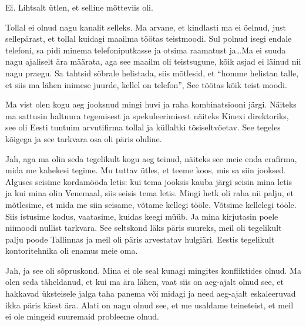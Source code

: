 
Ei. Lihtsalt ütlen, et selline mõtteviis oli. 


Tollal ei olnud nagu kanalit selleks. Ma arvane, et  kindlasti ma ei öelnud, just sellepärast, et tollal kuidagi maailma töötas teistmoodi. Sul polnud isegi endale telefoni, sa pidi minema telefoniputkasse ja otsima raamatust ja\ldots  Ma ei suuda nagu ajaliselt ära määrata, aga see maailm oli teistsugune, kõik asjad ei läinud nii nagu praegu. Sa tahtsid sõbrale helistada, siis mõtlesid, et \enquote{homme helistan talle, et siis ma lähen inimese juurde, kellel on telefon}, See töötas kõik teist moodi. 


Ma vist olen kogu aeg jooksnud mingi huvi ja raha kombinatsiooni järgi. Näiteks ma sattusin haltuura tegemisest ja spekuleerimisest näiteks Kinexi direktoriks, see oli Eesti tuntuim arvutifirma tollal ja küllaltki tõsiseltvõetav. See tegeles kõigega ja see tarkvara osa oli päris oluline. 


Jah, aga ma olin seda  tegelikult kogu aeg teinud, näiteks see meie enda erafirma, mida me kahekesi tegime. Mu tuttav ütles, et teeme koos, mis sa siin jooksed. Alguses seisime kordamööda letis: kui tema jooksis kauba järgi seisin mina letis  ja kui mina olin Venemaal, siis seisis tema letis. Mingi hetk oli raha nii palju, et mõtlesime, et mida me siin seisame, võtame kellegi tööle. Võtsime kellelegi tööle. Siis istusime kodus, vaatasime, kuidas keegi müüb. Ja mina kirjutasin poele niimoodi nullist tarkvara. See seltskond läks päris suureks, meil oli tegelikult palju poode Tallinnas ja meil oli päris arvestatav hulgiäri. Eestis tegelikult kontoritehnika oli enamus meie oma. 


Jah, ja see oli sõpruskond. Mina ei ole seal kunagi mingites konfliktides olnud. Ma olen seda täheldanud, et kui ma ära lähen, vaat siis on aeg-ajalt olnud see, et hakkavad üksteisele jalga  taha panema või midagi ja need aeg-ajalt eskaleeruvad ikka päris käest ära. Alati on nagu olnud  see, et me usaldame teineteist, et meil ei ole mingeid suuremaid probleeme olnud. 

